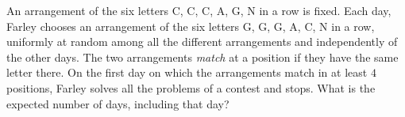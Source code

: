 An arrangement of the six letters C, C, C, A, G, N in a row is fixed. Each day, Farley chooses an arrangement of the six letters G, G, G, A, C, N in a row, uniformly at random among all the different arrangements and independently of the other days. The two arrangements \emph{match} at a position if they have the same letter there. On the first day on which the arrangements match in at least $4$ positions, Farley solves all the problems of a contest and stops. What is the expected number of days, including that day?
